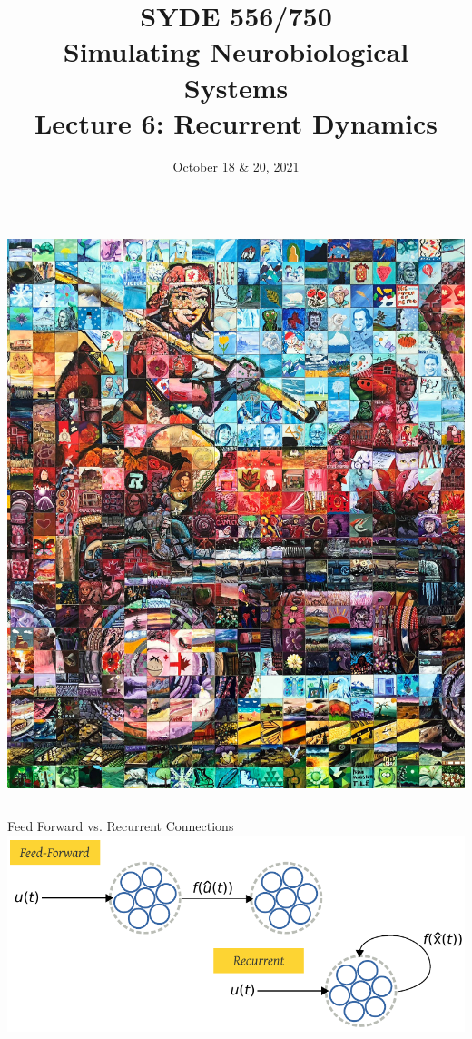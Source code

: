 \documentclass[handout,aspectratio=169]{beamer}
\date{October 18 \& 20, 2021}
\title{SYDE 556/750 \\ Simulating Neurobiological Systems \\ Lecture 6: Recurrent Dynamics}
\begin{document}
	
	\begin{frame}{}
		\vspace{0.5cm}
		\begin{columns}[c]
			\MakeTitle
			\includegraphics[width=\textwidth]{media/canada_150_mosaic_engine_small.jpg}
		\end{columns}
	\end{frame}

	\begin{frame}{Feed Forward vs. Recurrent Connections}
		\centering
		\includegraphics{media/feed_forward_recurrent.pdf}
	\end{frame}
\end{document}
